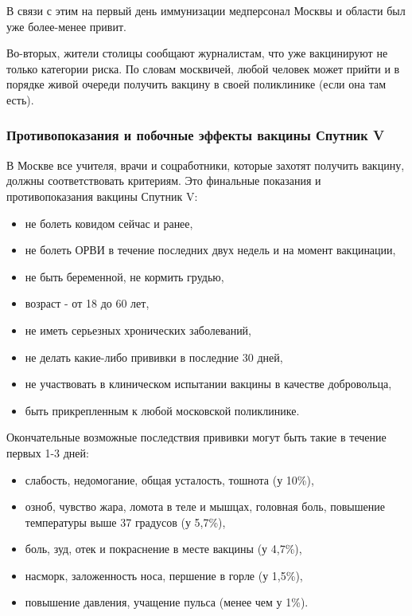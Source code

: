 {В связи с этим на первый день иммунизации медперсонал Москвы и области был уже
более-менее привит.

Во-вторых, жители столицы сообщают журналистам, что уже вакцинируют не только
категории риска. По словам москвичей, любой человек может прийти и в порядке
живой очереди получить вакцину в своей поликлинике (если она там есть). 

\subsubsection{Противопоказания и побочные эффекты вакцины Спутник V}

В Москве все учителя, врачи и соцработники, которые захотят получить вакцину,
должны соответствовать критериям. Это финальные показания и противопоказания
вакцины Спутник V: 

\begin{itemize}
  \item не болеть ковидом сейчас и ранее,
  \item не болеть ОРВИ в течение последних двух недель и на момент вакцинации, 
  \item не быть беременной, не кормить грудью,
  \item возраст - от 18 до 60 лет, 
  \item не иметь серьезных хронических заболеваний, 
  \item не делать какие-либо прививки в последние 30 дней,
  \item не участвовать в клиническом испытании вакцины в качестве добровольца, 
  \item быть прикрепленным к любой московской поликлинике. 
\end{itemize}

Окончательные возможные последствия прививки могут быть такие в течение первых 1-3 дней:

\begin{itemize}
  \item слабость, недомогание, общая усталость, тошнота (у 10\%), 
  \item озноб, чувство жара, ломота в теле и мышцах, головная боль, повышение температуры выше 37 градусов (у 5,7\%), 
  \item боль, зуд, отек и покраснение в месте вакцины (у 4,7\%), 
  \item насморк, заложенность носа, першение в горле (у 1,5\%), 
  \item повышение давления, учащение пульса (менее чем у 1\%). 
\end{itemize}

}

